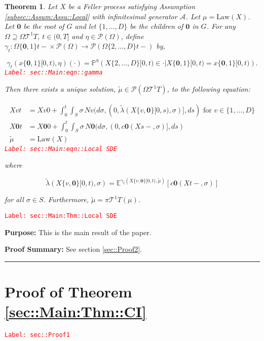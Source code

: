 \documentclass[12pt]{article}
\newcommand{\mb}{\mathbb}
\newcommand{\mc}{\mathcal}
\newcommand{\ra}{\rightarrow}
\newcommand{\te}{\text}
\newcommand{\tr}{\textcolor{red}}
\newcommand{\labe}[1]{\tr{\texttt{Label: #1}}}
\newcommand{\purpose}{\textbf{Purpose: }}
\newcommand{\pfsum}{\textbf{Proof Summary: }}
\newcommand{\lin}{\rule{\linewidth}{0.4 pt}}
\newcommand{\pr}{\mb{P}}							%
\newcommand{\exmu}[2]{\mb{E}^{#1}\left[#2\right]}	%
\newcommand{\pmsr}{\mc{P}}							%
\renewcommand{\root}{\mathbf{0}}				%
\renewcommand{\v}{v}							%
\renewcommand{\S}{S}							%
\newcommand{\s}{\sigma}							%
\newcommand{\T}{T}								%
\newcommand{\x}{x}								%
\renewcommand{\t}{t}							%
\newcommand{\proj}{\pi}							%
\renewcommand{\tt}{s}							%
\newcommand{\X}{X}								%
\newcommand{\IG}{\mc{A}}						%
\newcommand{\IGr}{c}							%
\newcommand{\degr}{D}							%
\newcommand{\tree}{\mc{T}}						%
\newcommand{\sln}[1]{^{#1}}						%
\newcommand{\poiss}{N}							%
\newcommand{\alt}[1]{\widetilde{#1}}			%
\newcommand{\m}{\mu}							%
\newcommand{\mmm}{\eta}							%
\newcommand{\cm}{\gamma}						%
\newcommand{\law}{\te{Law}}						%
\newcommand{\crate}{\alt{\lambda}}				%
\newtheorem{thms}{Theorem}[section]
\begin{document}
\begin{thms}
Let \(\X{}{}\) be a Feller process satisfying Assumption \ref{subsec::Assum:Assu::Local} with infinitesimal generator \(\IG\). Let \(\m{}{}{} = \law(\X{}{})\). Let \(\root\) be the root of \(G\) and let \(\{1,\dots,\degr\}\) be the children of \(\root\) in \(G\). For any \(\Omega \supseteq\Omega{\tree\sln{1}}{\T}\), \(\t\in (0,\T]\) and \(\mmm{}{}{} \in \pmsr(\Omega)\), define \(\cm_\t:\Omega{\{\root,1\}}{\t-}\times \pmsr(\Omega) \ra \pmsr(\Omega{\{2,\dots,\degr\}}{\t-})\) by,

\begin{equation}
\cm_\t(\x{\{\root,1\}}{[0,\t)},\mmm{}{}{})(\cdot) = \pr^{\mmm{}{}{}}\left(\X{\{2,\dots,\degr\}}{[0,\t)} \in \cdot|\X{\{\root,1\}}{[0,\t)} = \x{\{\root,1\}}{[0,\t)}\right).
\label{sec::Main:eqn::gamma}
\end{equation}
\labe{sec::Main:eqn::gamma}

Then there exists a unique solution, \(\alt{\m{}{}{}} \in \pmsr(\Omega{\tree\sln{1}}{\T})\), to the following equation:

\begin{align}
\X{\v}{\t} &= \X{\v}{0} + \int_0^\t\int_\S \s\,\poiss{\v}(d\s,(0,\crate{}(\X{\{\v,\root\}}{[0,\tt)},\s)],d\tt) \te{ for } \v \in \{1,\dots,\degr\}\nonumber\\
\X{\root}{\t} &= \X{\root}{0} + \int_0^\t\int_\S \s\,\poiss{\root}(d\s,(0,\IGr{\root}(\X{}{\tt-},\s)],d\tt)\nonumber\\
\alt{\m{}{}{}} &= \law(\X{}{})
\label{sec::Main:eqn::Local SDE}
\end{align}
\labe{sec::Main:eqn::Local SDE}

where

\[\crate{}(\X{\{\v,\root\}}{[0,\t)},\s) = \exmu{\cm_t(\X{\{\v,\root\}}{[0,\t)},\alt{\m{}{}{}})}{\IGr{\root}(\X{}{\t-},\s)}\]

for all \(\s\in \S\). Furthermore, \(\alt{\m{}{}{}} = \proj{\tree\sln{1}}{\T}(\m{}{}{})\).
\label{sec::Main:Thm::Local SDE}
\end{thms}
\labe{sec::Main:Thm::Local SDE}

\purpose This is the main result of the paper. 

\pfsum See section \ref{sec::Proof2}.

\lin

\section{Proof of Theorem \ref{sec::Main:Thm::CI}}
\label{sec::Proof1}\labe{sec::Proof1}
\end{document}
